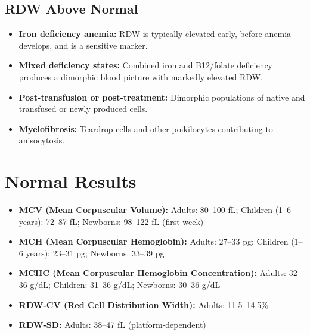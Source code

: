 \subsection*{RDW Above Normal}
\begin{itemize}
  \item \textbf{Iron deficiency anemia:} RDW is typically elevated early, before anemia develops, and is a sensitive marker.
  \item \textbf{Mixed deficiency states:} Combined iron and B12/folate deficiency produces a dimorphic blood picture with markedly elevated RDW.
  \item \textbf{Post-transfusion or post-treatment:} Dimorphic populations of native and transfused or newly produced cells.
  \item \textbf{Myelofibrosis:} Teardrop cells and other poikilocytes contributing to anisocytosis.
\end{itemize}

\section*{Normal Results}
\begin{itemize}
  \item \textbf{MCV (Mean Corpuscular Volume):} Adults: 80--100 fL; Children (1--6 years): 72--87 fL; Newborns: 98--122 fL (first week)
  \item \textbf{MCH (Mean Corpuscular Hemoglobin):} Adults: 27--33 pg; Children (1--6 years): 23--31 pg; Newborns: 33--39 pg
  \item \textbf{MCHC (Mean Corpuscular Hemoglobin Concentration):} Adults: 32--36 g/dL; Children: 31--36 g/dL; Newborns: 30--36 g/dL
  \item \textbf{RDW-CV (Red Cell Distribution Width):} Adults: 11.5--14.5\%
  \item \textbf{RDW-SD:} Adults: 38--47 fL (platform-dependent)
\end{itemize}

